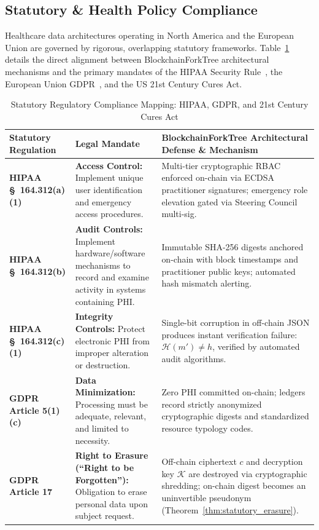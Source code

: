 \subsection{Statutory & Health Policy Compliance}
Healthcare data architectures operating in North America and the European Union are governed by rigorous, overlapping statutory frameworks. Table~\ref{tab:policy_compliance} details the direct alignment between BlockchainForkTree architectural mechanisms and the primary mandates of the HIPAA Security Rule~\cite{hipaa1996}, the European Union GDPR~\cite{gdpr2016}, and the US 21st Century Cures Act.

\begin{table}[t]
\centering
\caption{Statutory Regulatory Compliance Mapping: HIPAA, GDPR, and 21st Century Cures Act}
\label{tab:policy_compliance}
\footnotesize
\setlength{\tabcolsep}{3pt}
\begin{tabularx}{\textwidth}{p{3.5cm}p{4.2cm}X}
\toprule
\textbf{Statutory Regulation} & \textbf{Legal Mandate} & \textbf{BlockchainForkTree Architectural Defense \& Mechanism} \\
\midrule
\textbf{HIPAA \S~164.312(a)(1)} & \textbf{Access Control:} Implement unique user identification and emergency access procedures. & Multi-tier cryptographic RBAC enforced on-chain via ECDSA practitioner signatures; emergency role elevation gated via Steering Council multi-sig. \\
\addlinespace
\textbf{HIPAA \S~164.312(b)} & \textbf{Audit Controls:} Implement hardware/software mechanisms to record and examine activity in systems containing PHI. & Immutable SHA-256 digests anchored on-chain with block timestamps and practitioner public keys; automated hash mismatch alerting. \\
\addlinespace
\textbf{HIPAA \S~164.312(c)(1)} & \textbf{Integrity Controls:} Protect electronic PHI from improper alteration or destruction. & Single-bit corruption in off-chain JSON produces instant verification failure: $\mathcal{H}(m') \neq h$, verified by automated audit algorithms. \\
\addlinespace
\textbf{GDPR Article 5(1)(c)} & \textbf{Data Minimization:} Processing must be adequate, relevant, and limited to necessity. & Zero PHI committed on-chain; ledgers record strictly anonymized cryptographic digests and standardized resource typology codes. \\
\addlinespace
\textbf{GDPR Article 17} & \textbf{Right to Erasure (``Right to be Forgotten''):} Obligation to erase personal data upon subject request. & Off-chain ciphertext $c$ and decryption key $\mathcal{K}$ are destroyed via cryptographic shredding; on-chain digest becomes an uninvertible pseudonym (Theorem~\ref{thm:statutory_erasure}). \\

\end{tabularx}
\end{table}
